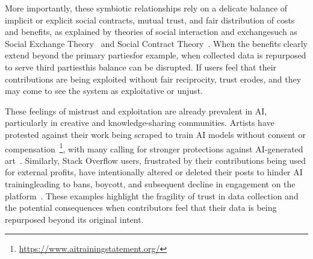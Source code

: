 More importantly, these symbiotic relationships rely on a delicate balance of implicit or explicit social contracts, mutual trust, and fair distribution of costs and benefits, as explained by theories of social interaction and exchange\textemdash{}such as Social Exchange Theory~\cite{homans1958social} and Social Contract Theory~\cite{rousseau1762social}. When the benefits clearly extend beyond the primary parties\textemdash{}for example, when collected data is repurposed to serve third parties\textemdash{}this balance can be disrupted. If users feel that their contributions are being exploited without fair reciprocity, trust erodes, and they may come to see the system as exploitative or unjust.

These feelings of mistrust and exploitation are already prevalent in AI, particularly in creative and knowledge-sharing communities. Artists have protested against their work being scraped to train AI models without consent or compensation~\cite{jiang2023ai}\footnote{\url{https://www.aitrainingstatement.org/}}, with many calling for stronger protections against AI-generated art~\cite{guardian2025aiart}. Similarly, Stack Overflow users, frustrated by their contributions being used for external profits, have intentionally altered or deleted their posts to hinder AI training\textemdash{}leading to bans, boycott, and subsequent decline in engagement on the platform~\cite{ars2024stackoverflow, tomshardware2024stackoverflow}. These examples highlight the fragility of trust in data collection and the potential consequences when contributors feel that their data is being repurposed beyond its original intent.